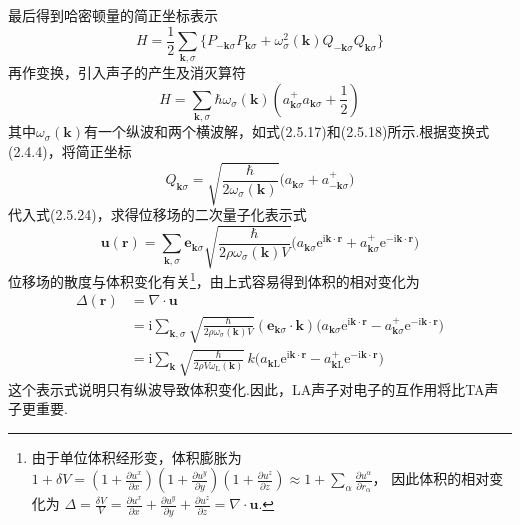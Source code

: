 最后得到哈密顿量的简正坐标表示
\begin{equation}
  H=\frac{1}{2}\sum_{\boldsymbol{k},\sigma}
  \bigl\{P_{-\boldsymbol{k}\sigma}P_{\boldsymbol{k}\sigma}
  +\omega_{\sigma}^2(\boldsymbol{k})Q_{-\boldsymbol{k}\sigma}Q_{\boldsymbol{k}\sigma}\bigr\}
\end{equation}
再作变换，引入声子的产生及消灭算符
\begin{equation}
  H=\sum_{\boldsymbol{k},\sigma}\hbar\omega_{\sigma}(\boldsymbol{k})
  \left(a_{\boldsymbol{k}\sigma}^{+}a_{\boldsymbol{k}\sigma}+\frac{1}{2}\right)
\end{equation}
其中$\omega_{\sigma}(\boldsymbol{k})$有一个纵波和两个横波解，如式(2.5.17)和(2.5.18)所示.根据变换式(2.4.4)，将简正坐标
\begin{equation}
  Q_{\boldsymbol{k}\sigma}=\sqrt{\frac{\hbar}{2\omega_{\sigma}(\boldsymbol{k})}}
  \bigl(a_{\boldsymbol{k}\sigma}+a_{-\boldsymbol{k}\sigma}^{+}\bigr)
\end{equation}
代入式(2.5.24)，求得位移场的二次量子化表示式
\begin{equation}
  \boldsymbol{u}(\boldsymbol{r})=\sum_{\boldsymbol{k},\sigma}
  \boldsymbol{e}_{\boldsymbol{k}\sigma}
  \sqrt{\frac{\hbar}{2\rho\omega_{\sigma}(\boldsymbol{k})V}}
  \bigl(a_{\boldsymbol{k}\sigma}\mathrm{e}^{\mathrm{i}\boldsymbol{k}\cdot\boldsymbol{r}}
  +a_{\boldsymbol{k}\sigma}^{+}\mathrm{e}^{-\mathrm{i}\boldsymbol{k}\cdot\boldsymbol{r}}\bigr)
\end{equation}
位移场的散度与体积变化有关\footnote{由于单位体积经形变，体积膨胀为
$1+\delta V=\left(1+\frac{\partial u^x}{\partial x}\right)
\left(1+\frac{\partial u^y}{\partial y}\right)
\left(1+\frac{\partial u^z}{\partial z}\right)
\approx1+\sum_{\alpha}\frac{\partial u^{\alpha}}{\partial r_{\alpha}}$，
因此体积的相对变化为
$\Delta=\frac{\delta V}{V}=\frac{\partial u^x}{\partial x}
+\frac{\partial u^y}{\partial y}
+\frac{\partial u^z}{\partial z}=\nabla\cdot\boldsymbol{u}$.}，由上式容易得到体积的相对变化为
\begin{equation}
\begin{aligned}
  \Delta(\boldsymbol{r})&=\nabla\cdot\boldsymbol{u}\\
  &=\mathrm{i}\sum_{\boldsymbol{k},\sigma}
  \sqrt{\frac{\hbar}{2\rho\omega_{\sigma}(\boldsymbol{k})V}}
  (\boldsymbol{e}_{\boldsymbol{k}\sigma}\cdot\boldsymbol{k})
  \bigl(a_{\boldsymbol{k}\sigma}\mathrm{e}^{\mathrm{i}\boldsymbol{k}\cdot\boldsymbol{r}}
  -a_{\boldsymbol{k}\sigma}^{+}\mathrm{e}^{-\mathrm{i}\boldsymbol{k}\cdot\boldsymbol{r}}\bigr)\\
  &=\mathrm{i}\sum_{\boldsymbol{k}}
  \sqrt{\frac{\hbar}{2\rho V\omega_{\mathrm{L}}(\boldsymbol{k})}}\,k
  \bigl(a_{\boldsymbol{k}\mathrm{L}}\mathrm{e}^{\mathrm{i}\boldsymbol{k}\cdot\boldsymbol{r}}
  -a_{\boldsymbol{k}\mathrm{L}}^{+}\mathrm{e}^{-\mathrm{i}\boldsymbol{k}\cdot\boldsymbol{r}}\bigr)
\end{aligned}
\end{equation}
这个表示式说明只有纵波导致体积变化.因此，LA声子对电子的互作用将比TA声子更重要.

